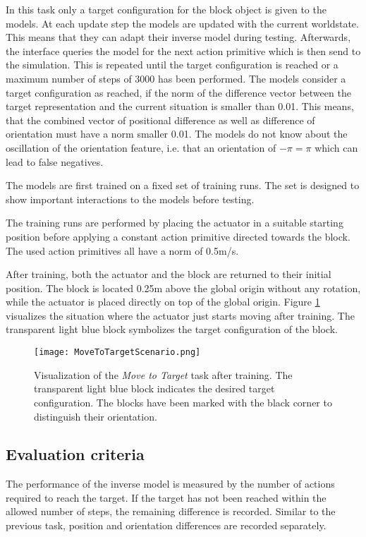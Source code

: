 In this task only a target configuration for the block object is given to the models. At each update step the models are updated with the current worldstate.
This means that they can adapt their inverse model during testing.
Afterwards, the interface queries the model for the next action primitive which is then send to the simulation. This is repeated until the target configuration is reached or a maximum number of steps of 3000 %
has been performed.
The models consider a target configuration as reached, if the norm of the difference vector between the target representation and the current situation is smaller than 0.01. This means, that the combined vector of positional difference as well as difference of orientation must have a norm smaller 0.01. The models do not know about the oscillation of the orientation feature, i.e. that an orientation of $-\pi = \pi$ which can lead to false negatives.

The models are first trained on a fixed set of training runs. The set is designed to show important interactions to the models before testing.

The training runs are performed by placing the actuator in a suitable starting position before applying a constant action primitive directed towards the block.
The used action primitives all have a norm of 0.5m/s.

After training, both the actuator and the block are returned to their initial position. The block is located 0.25m above the global origin without any rotation, while the actuator is placed directly on top of the global origin.
Figure \ref{fig:moveToTargetScenario} visualizes the situation where the actuator just starts moving after training. The transparent light blue block symbolizes the target configuration of the block.

\begin{figure}
\centering
\texttt{[image: MoveToTargetScenario.png]}
\caption{Visualization of the \textit{Move to Target} task after training. The transparent light blue block indicates the desired target configuration. The blocks have been marked with the black corner to distinguish their orientation.}
\label{fig:moveToTargetScenario}
\end{figure}

\subsection{Evaluation criteria}

The performance of the inverse model is measured by the number of actions required to reach the target. If the target has not been reached within the allowed number of steps, the remaining difference is recorded. Similar to the previous task, position and orientation differences are recorded separately.

